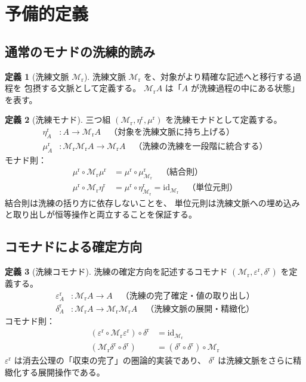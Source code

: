\documentclass[11pt,a4paper]{article}
\theoremstyle{definition}
\newtheorem{definition}{定義}[section]
\newcommand{\Mr}{\mathcal{M}_{\mathrm{r}}}
\newcommand{\etar}{\eta^{\mathrm{r}}}
\newcommand{\mur}{\mu^{\mathrm{r}}}
\newcommand{\epsr}{\varepsilon^{\mathrm{r}}}
\newcommand{\deltar}{\delta^{\mathrm{r}}}
\begin{document}
\section{予備的定義}

\subsection{通常のモナドの洗練的読み}

\begin{definition}[洗練文脈 $\Mr$]
洗練文脈 $\Mr$ を、対象がより精確な記述へと移行する過程を
包摂する文脈として定義する。
$\Mr A$ は「$A$ が洗練過程の中にある状態」を表す。
\end{definition}

\begin{definition}[洗練モナド]
三つ組 $(\Mr, \etar, \mur)$ を洗練モナドとして定義する。
\begin{align}
\etar_A &: A \to \Mr A \quad \text{（対象を洗練文脈に持ち上げる）}\\
\mur_A &: \Mr\Mr A \to \Mr A \quad \text{（洗練の洗練を一段階に統合する）}
\end{align}
モナド則：
\begin{align}
\mur \circ \Mr\mur &= \mur \circ \mur_{\Mr} \quad \text{（結合則）}\\
\mur \circ \Mr\etar &= \mur \circ \etar_{\Mr} = \mathrm{id}_{\Mr} \quad \text{（単位元則）}
\end{align}
結合則は洗練の括り方に依存しないことを、
単位元則は洗練文脈への埋め込みと取り出しが恒等操作と両立することを保証する。
\end{definition}

\subsection{コモナドによる確定方向}

\begin{definition}[洗練コモナド]
洗練の確定方向を記述するコモナド $(\Mr, \epsr, \deltar)$ を定義する。
\begin{align}
\epsr_A &: \Mr A \to A \quad \text{（洗練の完了確定・値の取り出し）}\\
\deltar_A &: \Mr A \to \Mr\Mr A \quad \text{（洗練文脈の展開・精緻化）}
\end{align}
コモナド則：
\begin{align}
(\epsr \circ \Mr\epsr) \circ \deltar &= \mathrm{id}_{\Mr} \\
(\Mr\deltar \circ \deltar) &= (\deltar \circ \deltar) \circ \Mr
\end{align}
$\epsr$ は消去公理の「収束の完了」の圏論的実装であり、
$\deltar$ は洗練文脈をさらに精緻化する展開操作である。
\end{definition}
\end{document}
